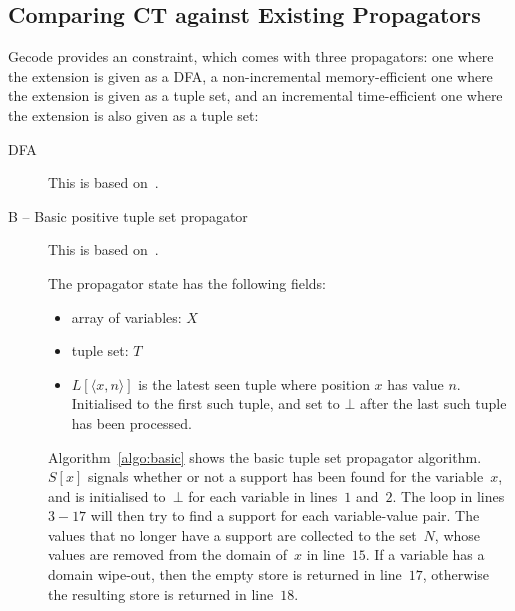 \documentclass[a4paper,11pt]{article}
\newcommand{\Algoref}[1]{Algorithm~\ref{#1}}
\numberwithin{equation}{section}
\begin{document}
\subsection{Comparing CT against Existing Propagators}

Gecode provides an  constraint, which
comes with three propagators: one where the extension
is given as a DFA, a non-incremental memory-efficient one where
the extension is given as a tuple set, and an incremental
time-efficient one where the extension is also given as a tuple set:

\begin{description}
  \item[DFA] This is based on~\cite{Pesant:seqs}.
  \item[B -- Basic positive tuple set propagator]
    This is based on~\cite{DBLP:journals/ai/BessiereRYZ05}.

     The propagator state has the following fields:

     \begin{itemize}
     \item array of variables: $X$
     \item tuple set: $T$
     \item $L[\langle x,n \rangle]$ is the latest seen tuple where position
       $x$ has value $n$.  Initialised to the first such tuple, and set to
       $\bot$ after the last such tuple has been processed.
     \end{itemize}

     \Algoref{algo:basic} shows the basic tuple set propagator algorithm.
     $S[x]$ signals whether or not a support has been found for the variable~$x$,
     and is initialised to~$\bot$ for each variable in lines~$1$ and~$2$.
     The loop in lines
     $3-17$ will then try to find a support for each variable-value pair.
     The values that no longer have a support are collected to
     the set~$N$, whose values are removed from the domain of~$x$ in line~$15$.
     If a variable has a domain wipe-out, 
     then the empty store is returned in line~$17$, otherwise the resulting store
     is returned in line~$18$.
     

\end{description}
\end{document}
